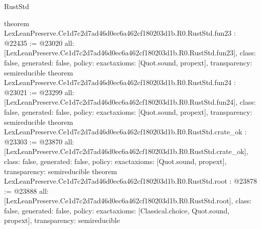 \begin{lexlean}{RustStd}
\begin{coremodule}
{}
theorem LexLeanPreserve.Ce1d7c2d7ad46d0ec6a462cf180203d1b.R0.RustStd.fun23 : @22435 := @23020 {
  all: [LexLeanPreserve.Ce1d7c2d7ad46d0ec6a462cf180203d1b.R0.RustStd.fun23],
  class: false,
  generated: false,
  policy: exact{axioms: [Quot.sound, propext]},
  transparency: semireducible
}
theorem LexLeanPreserve.Ce1d7c2d7ad46d0ec6a462cf180203d1b.R0.RustStd.fun24 : @23021 := @23299 {
  all: [LexLeanPreserve.Ce1d7c2d7ad46d0ec6a462cf180203d1b.R0.RustStd.fun24],
  class: false,
  generated: false,
  policy: exact{axioms: [Quot.sound, propext]},
  transparency: semireducible
}
theorem LexLeanPreserve.Ce1d7c2d7ad46d0ec6a462cf180203d1b.R0.RustStd.crate_ok : @23303 := @23870 {
  all: [LexLeanPreserve.Ce1d7c2d7ad46d0ec6a462cf180203d1b.R0.RustStd.crate_ok],
  class: false,
  generated: false,
  policy: exact{axioms: [Quot.sound, propext]},
  transparency: semireducible
}
theorem LexLeanPreserve.Ce1d7c2d7ad46d0ec6a462cf180203d1b.R0.RustStd.root : @23878 := @23888 {
  all: [LexLeanPreserve.Ce1d7c2d7ad46d0ec6a462cf180203d1b.R0.RustStd.root],
  class: false,
  generated: false,
  policy: exact{axioms: [Classical.choice, Quot.sound, propext]},
  transparency: semireducible
}


\end{coremodule}
\end{lexlean}
